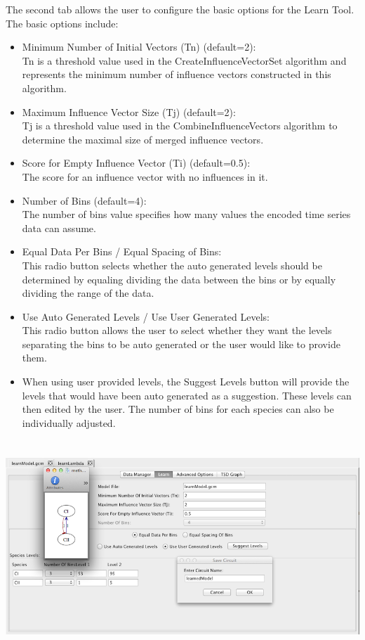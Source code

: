 \documentclass[titlepage,11pt]{article}
\begin{document}
\noindent
The second tab allows the user to configure the basic options for the Learn Tool.  The basic options include:
\begin{itemize}
\item Minimum Number of Initial Vectors (Tn) (default=2): \\
Tn is a threshold value used in the CreateInfluenceVectorSet algorithm and represents the minimum number of influence vectors constructed in this algorithm.
\item Maximum Influence Vector Size (Tj) (default=2): \\
Tj is a threshold value used in the CombineInfluenceVectors algorithm to determine the maximal size of merged influence vectors.
\item Score for Empty Influence Vector (Ti) (default=0.5): \\
The score for an influence vector with no influences in it.
\item Number of Bins (default=4): \\
The number of bins value specifies how many values the encoded time series data can assume.
\item Equal Data Per Bins / Equal Spacing of Bins: \\
This radio button selects whether the auto generated levels should be determined by equaling dividing the data between the bins or by equally dividing the range of the data. 
\item Use Auto Generated Levels / Use User Generated Levels: \\
This radio button allows the user to select whether they want the levels separating the bins to be auto generated or the user would like to provide them. 
\item When using user provided levels, the Suggest Levels button will provide the levels that would have been auto
generated as a suggestion. These levels can then edited by the user.  The number of bins for each species can also be individually adjusted.  
\end{itemize}

\begin{center}
\includegraphics[height=80mm]{screenshots/learn}
\end{center}
\end{document}
